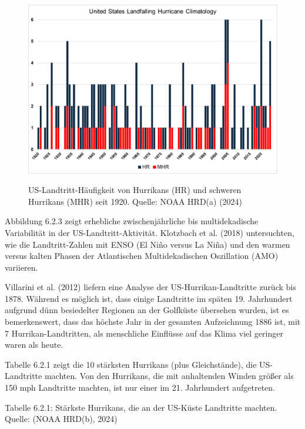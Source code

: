 \documentclass[12pt,paper=a4,DIV=12,parskip=never,chapterprefix=false,headings=standardclasses]{scrreprt}
\begin{document}
\begin{figure}[H]
\begin{center}
\includegraphics[width=1.0\textwidth]{bilder/bilderKlima-0040.png}\\[1cm]
\end{center}
\caption{US-Landtritt-Häufigkeit von Hurrikans (HR) und schweren Hurrikans (MHR) seit 1920. Quelle: NOAA HRD(a) (2024)}
\end{figure}

Abbildung 6.2.3 zeigt erhebliche zwischenjährliche bis multidekadische Variabilität in der US-Landtritt-Aktivität. Klotzbach et al. (2018) untersuchten, wie die Landtritt-Zahlen mit ENSO (El Niño versus La Niña) und den warmen versus kalten Phasen der Atlantischen Multidekadischen Oszillation (AMO) variieren.

Villarini et al. (2012) liefern eine Analyse der US-Hurrikan-Landtritte zurück bis 1878. Während es möglich ist, dass einige Landtritte im späten 19. Jahrhundert aufgrund dünn besiedelter Regionen an der Golfküste übersehen wurden, ist es bemerkenswert, dass das höchste Jahr in der gesamten Aufzeichnung 1886 ist, mit 7 Hurrikan-Landtritten, als menschliche Einflüsse auf das Klima viel geringer waren als heute.

Tabelle 6.2.1 zeigt die 10 stärksten Hurrikans (plus Gleichstände), die US-Landtritte machten. Von den Hurrikans, die mit anhaltenden Winden größer als 150 mph Landtritte machten, ist nur einer im 21. Jahrhundert aufgetreten.

Tabelle 6.2.1: Stärkste Hurrikans, die an der US-Küste Landtritte machten. Quelle: (NOAA HRD(b), 2024)
\end{document}
